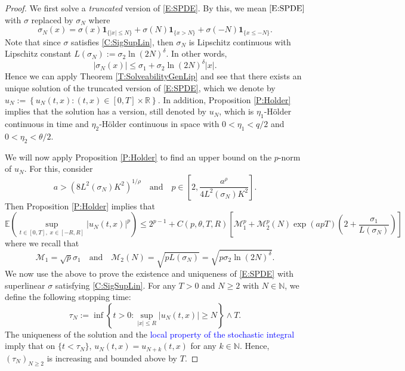 \documentclass[a4paper,11pt]{article}
\numberwithin{equation}{section}
\theoremstyle{plain}
\theoremstyle{definition}
\newcommand{\R}{\mathbb{R}}
\numberwithin{NQ}{section}
\numberwithin{LQ}{section}
\numberwithin{ZQ}{section}
\begin{document}
	\begin{proof}
		We first solve a {\it truncated} version of \eqref{E:SPDE}. By this, we mean $\eqref{E:SPDE}$ with $\sigma$ replaced by $\sigma_N$ where 
		\[
		\sigma_N(x) = \sigma(x)\textbf{1}_{\{|x| \le N\}} + \sigma(N)\textbf{1}_{\{x  >N\}} + \sigma(-N)\textbf{1}_{\{x \le -N\}}.
		\]
		Note that since $\sigma$ satisfies \eqref{C:SigSupLin}, then $\sigma_N$ is Lipschitz continuous with Lipschitz constant $L(\sigma_N) := \sigma_2 \ln(2N)^{\delta}$. In other words, 
		\[
		|\sigma_N(x)| \le \sigma_1 + \sigma_2 \ln(2N)^{\delta}|x|.
		\]
		Hence we can apply Theorem \ref{T:SolveabilityGenLip} and see that there exists an unique solution of the truncated version of \eqref{E:SPDE}, which we denote by $u_N := \left\{ u_N(t,x) : (t,x) \in [0,T] \times \R \right\}$. In addition, Proposition \ref{P:Holder} implies that the solution has a version, still denoted by $u_N$, which is $\eta_1$-H\"older continuous in time and $\eta_2$-H\"older continuous in space  with $0<\eta_1 < q/2$ and $0<\eta_2 < \theta/2$.
		
		We will now apply Proposition \ref{P:Holder} to find an upper bound on the $p$-norm of $u_N$. For this, consider 
		\[
		a > \left( 8 L^2(\sigma_N) K^2 \right)^{1/\rho} \quad \text{and} \quad p \in \left[ 2, \frac{a^{ \rho}}{4L^2(\sigma_N)K^2} \right].
		\] 
		Then Proposition \ref{P:Holder} implies that 
		\begin{equation}
		\label{E:u_NMomBdd}
		\mathbb{E}\left(\sup_{t\in[0,T],\; x\in[-R,R]} |u_N(t,x)|^p\right) \le 2^{p-1} + C(p, \theta, T,R)\left[\mathcal{M}_1^p + \mathcal{M}_2^p(N) \exp(apT)\left(2+ \frac{\sigma_1}{L(\sigma_N)}\right)\right]
		\end{equation}
		where we recall that 
		\begin{equation}
		\label{D:M1&2forSig_N}
		\mathcal{M}_1 = \sqrt{p}\sigma_1 \quad \text{and} \quad \mathcal{M}_2(N) = \sqrt{pL(\sigma_N)} = \sqrt{p\sigma_2\ln(2N)^\delta}.
		\end{equation}
		We now use the above to prove the existence and uniqueness of \eqref{E:SPDE} with superlinear $\sigma$ satisfying \eqref{C:SigSupLin}. For any $T>0$ and $N \ge 2$ with $N\in \mathbb{N}$, we define the following stopping time:
		\begin{equation}
		\tau_N := \inf \left\{ t>0 : \sup_{|x| \le R} |u_N(t,x)| \ge N \right\} \wedge T.
		\end{equation}
		The uniqueness of the solution and the \textcolor{blue}{local property of the stochastic integral} imply that on $\{t < \tau_N\}$, $u_N(t,x) = u_{N+k}(t,x)$ for any $k \in \mathbb{N}$. Hence, $(\tau_N)_{N \ge 2}$ is increasing and bounded above by $T$. 
		

\end{proof}
\end{document}
